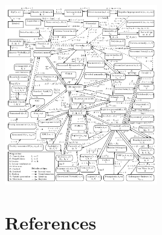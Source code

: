 \documentclass[10pt,twocolumn,portrait]{article}
\begin{document}
\includegraphics[width=0.5\textwidth,height=\textheight]{UnivariateDistribution.png}

\hypertarget{references}{%
\section{References}\label{references}}

\newpage
\onecolumn

\fontsize{8pt}{12pt}
\end{document}
